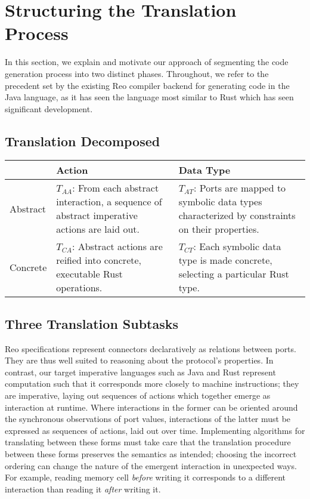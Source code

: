 
\section{Structuring the Translation Process}
\label{sec:two_phase}
In this section, we explain and motivate our approach of segmenting the code generation process into two distinct phases. Throughout, we refer to the precedent set by the existing Reo compiler backend for generating code in the Java language, as it has seen the language most similar to Rust which has seen significant development.   


\subsection{Translation Decomposed}

\begin{table}[]
	\begin{tabular}{l|p{6cm}p{6cm}}
		& Action & Data Type \\ \hline
		Abstract & $T_{AA}$: From each abstract interaction, a sequence of abstract imperative actions are laid out. & $T_{AT}$: Ports are mapped to symbolic data types characterized by constraints on their properties. \\
		Concrete & $T_{CA}$: Abstract actions are reified into concrete, executable Rust operations. & $T_{CT}$: Each symbolic data type is made concrete, selecting a particular Rust type.
	\end{tabular}
\end{table}

\subsection{Three Translation Subtasks}
\label{sec:sub_tasks}
Reo specifications represent connectors declaratively as relations between ports. They are thus well suited to reasoning about the protocol's properties. In contrast, our target imperative languages such as Java and Rust represent computation such that it corresponds more closely to machine instructions; they are imperative, laying out sequences of actions which together emerge as interaction at runtime. Where interactions in the former can be oriented around the synchronous observations of port values, interactions of the latter must be expressed as sequences of actions, laid out over time. Implementing algorithms for translating between these forms must take care that the translation procedure between these forms preserves the semantics as intended; choosing the incorrect ordering can change the nature of the emergent interaction in unexpected ways. For example, reading memory cell \textit{before} writing it corresponds to a different interaction than reading it \textit{after} writing it. 

